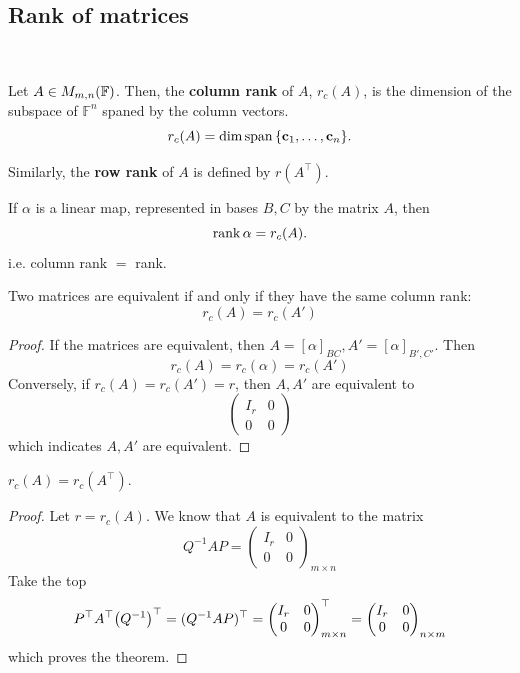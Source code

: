 \documentclass[a4paper,11pt]{article}
\begin{document}
\subsection{Rank of matrices}\ \vspace*{-1.5em}
\begin{definition}
	Let $ A \in M_{m,n}({\mathbb{F}}) $.
	Then, the \textbf{column rank} of $ A $, $ r_c(A) $, is the dimension of the subspace of $ \mathbb{F}^n $ spaned by the column vectors.
	\[
		r_c(A) = \dim \operatorname{span} \qty{{\bf c}_1, \dots, {\bf c}_n}.
	\]

    Similarly, the \textbf{row rank} of $A$ is defined by $ r(A^\top) $.
\end{definition}

\begin{remark}
	If $ \alpha $ is a linear map, represented in bases $ B, C $ by the matrix $ A $, then
	\[
		\rank \alpha = r_c(A). 
	\]
    i.e. column rank $=$ rank.
\end{remark}

\begin{proposition}
	Two matrices are equivalent if and only if they have the same column rank:
	\[
		r_c(A) = r_c(A')
	\]
\end{proposition}
\begin{proof}
	If the matrices are equivalent, then $ A = [\alpha]_{BC}, A' = [\alpha]_{B',C'} $.
	Then
	\[
		r_c(A) = r_c(\alpha) = r_c(A')
	\]
	Conversely, if $ r_c(A) = r_c(A') = r $, then $ A, A' $ are equivalent to
	\[
		\begin{pmatrix}
			I_r & 0 \\
			0   & 0
		\end{pmatrix}
	\]
	which indicates $ A, A' $ are equivalent.
\end{proof}

\begin{theorem}
    $ r_c(A) = r_c(A^\top) $. 
\end{theorem}
\begin{proof}
    Let $ r = r_c(A) $. We know that $A$ is equivalent to the matrix 
    \[
        Q^{-1}AP = \begin{pmatrix}
			I_r & 0 \\
			0   & 0
		\end{pmatrix}_{m\times n}
    \]
    Take the top
    \[
		P^\top A^\top \qty(Q^{-1})^\top = (Q^{-1}AP)^\top = \begin{pmatrix}
			I_r & 0 \\
			0   & 0
		\end{pmatrix}_{m \times n}^\top = \begin{pmatrix}
			I_r & 0 \\
			0   & 0
		\end{pmatrix}_{n \times m}
	\]
    which proves the theorem. 
\end{proof}
\end{document}
